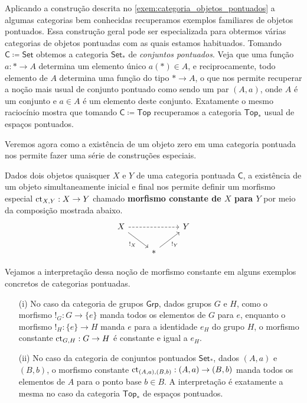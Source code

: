 \begin{exem}
  \label{exem:conjuntos_e_espacos_pontuados}
  Aplicando a construção descrita no \cref{exem:categoria_objetos_pontuados} a algumas categorias bem conhecidas recuperamos exemplos familiares de objetos pontuados.
   Essa construção geral pode ser especializada para obtermos várias categorias de objetos pontuadas com as quais estamos habituados.
  Tomando $\mathsf{C} \coloneqq \mathsf{Set}$ obtemos a categoria $\mathsf{Set_{*}}$ de \emph{conjuntos pontuados}.
  Veja que uma função $a: * \to A$ determina um elemento único $a(*) \in A$, e reciprocamente, todo elemento de $A$ determina uma função do tipo $* \to A$, o que nos permite recuperar a noção mais usual de conjunto pontuado como sendo um par $(A,a)$, onde $A$ é um conjunto e $a \in A$ é um elemento deste conjunto.
  Exatamente o mesmo raciocínio mostra que tomando $\mathsf{C} \coloneqq \mathsf{Top}$ recuperamos a categoria $\mathsf{Top_{*}}$ usual de espaços pontuados.
\end{exem}

Veremos agora como a existência de um objeto zero em uma categoria pontuada nos permite fazer uma série de construções especiais.

Dados dois objetos quaisquer $X$ e $Y$ de uma categoria pontuada $\mathsf{C}$, a existência de um objeto simultaneamente inicial e final nos permite definir um morfismo especial $\mathrm{ct}_{X,Y}: X \to Y$ chamado \textbf{morfismo constante de $X$ para $Y$} por meio da composição mostrada abaixo.
\begin{displaymath}
  \begin{tikzcd}
    X
    \arrow[rd, "!_{X}" swap]
    \arrow[rr, dashed]
    & & Y
    \\ & *
    \arrow[ru, "!_{Y}" swap]
  \end{tikzcd}
\end{displaymath}

\begin{exem}
  Vejamos a interpretação dessa noção de morfismo constante em alguns exemplos concretos de categorias pontuadas.

  \begin{enumerate}
  \item[(i)] No caso da categoria de grupos $\mathsf{Grp}$, dados grupos $G$ e $H$, como o morfismo $!_{G}: G \to \{e\}$ manda todos os elementos de $G$ para $e$, enquanto o morfismo $!_{H}: \{e\} \to H$ manda $e$ para a identidade $e_{H}$ do grupo $H$, o morfismo constante $\mathrm{ct}_{G,H}: G \to H$ é constante e igual a $e_{H}$.

  \item[(ii)] No caso da categoria de conjuntos pontuados $\mathsf{Set_{*}}$, dados $(A,a)$ e $(B,b)$, o morfismo constante $\mathrm{ct}_{(A,a),(B,b)}: (A,a) \to (B,b)$ manda todos os elementos de $A$ para o ponto base $b \in B$.
    A interpretação é exatamente a mesma no caso da categoria $\mathsf{Top_{*}}$ de espaços pontuados.
  \end{enumerate}
\end{exem}

